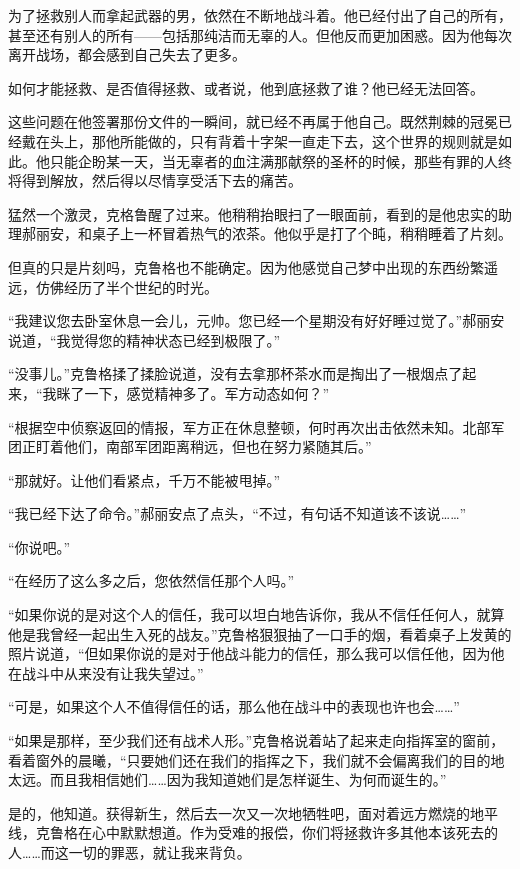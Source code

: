 为了拯救别人而拿起武器的男，依然在不断地战斗着。他已经付出了自己的所有，甚至还有别人的所有——包括那纯洁而无辜的人。但他反而更加困惑。因为他每次离开战场，都会感到自己失去了更多。

如何才能拯救、是否值得拯救、或者说，他到底拯救了谁？他已经无法回答。

这些问题在他签署那份文件的一瞬间，就已经不再属于他自己。既然荆棘的冠冕已经戴在头上，那他所能做的，只有背着十字架一直走下去，这个世界的规则就是如此。他只能企盼某一天，当无辜者的血注满那献祭的圣杯的时候，那些有罪的人终将得到解放，然后得以尽情享受活下去的痛苦。

猛然一个激灵，克格鲁醒了过来。他稍稍抬眼扫了一眼面前，看到的是他忠实的助理郝丽安，和桌子上一杯冒着热气的浓茶。他似乎是打了个盹，稍稍睡着了片刻。

但真的只是片刻吗，克鲁格也不能确定。因为他感觉自己梦中出现的东西纷繁遥远，仿佛经历了半个世纪的时光。

“我建议您去卧室休息一会儿，元帅。您已经一个星期没有好好睡过觉了。”郝丽安说道，“我觉得您的精神状态已经到极限了。”

“没事儿。”克鲁格揉了揉脸说道，没有去拿那杯茶水而是掏出了一根烟点了起来，“我眯了一下，感觉精神多了。军方动态如何？”

“根据空中侦察返回的情报，军方正在休息整顿，何时再次出击依然未知。北部军团正盯着他们，南部军团距离稍远，但也在努力紧随其后。”

“那就好。让他们看紧点，千万不能被甩掉。”

“我已经下达了命令。”郝丽安点了点头，“不过，有句话不知道该不该说……”

“你说吧。”

“在经历了这么多之后，您依然信任那个人吗。”

“如果你说的是对这个人的信任，我可以坦白地告诉你，我从不信任任何人，就算他是我曾经一起出生入死的战友。”克鲁格狠狠抽了一口手的烟，看着桌子上发黄的照片说道，“但如果你说的是对于他战斗能力的信任，那么我可以信任他，因为他在战斗中从来没有让我失望过。”

“可是，如果这个人不值得信任的话，那么他在战斗中的表现也许也会……”

“如果是那样，至少我们还有战术人形。”克鲁格说着站了起来走向指挥室的窗前，看着窗外的晨曦，“只要她们还在我们的指挥之下，我们就不会偏离我们的目的地太远。而且我相信她们……因为我知道她们是怎样诞生、为何而诞生的。”

是的，他知道。获得新生，然后去一次又一次地牺牲吧，面对着远方燃烧的地平线，克鲁格在心中默默想道。作为受难的报偿，你们将拯救许多其他本该死去的人……而这一切的罪恶，就让我来背负。


